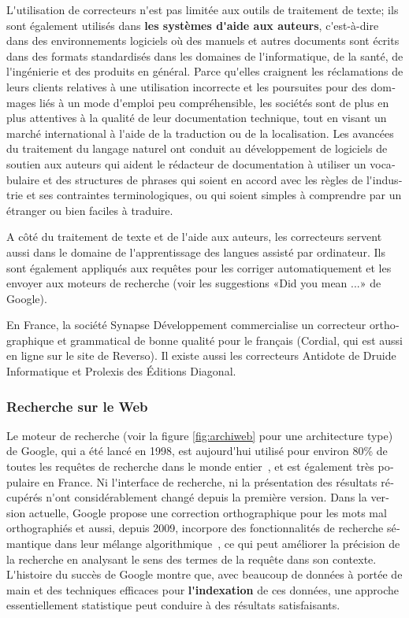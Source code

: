 \documentclass[]{../metanetpaper}
\begin{document}
\begin{french}
\begin{multicols}{2}
L{\mbox '}utilisation de correcteurs n{\mbox '}est pas limitée aux outils de
traitement de texte; ils sont également utilisés dans {\bf les systèmes
d{\mbox '}aide aux auteurs}, c{\mbox '}est-à-dire dans des environnements logiciels où
des manuels et autres documents sont écrits dans des formats
standardisés dans les domaines de l{\mbox '}informatique, de la santé, de
l{\mbox '}ingénierie et des produits en général. Parce qu{\mbox '}elles craignent les
réclamations de leurs clients relatives à une utilisation incorrecte
et les poursuites pour des dommages liés à un mode d{\mbox '}emploi peu
compréhensible, les sociétés sont de plus en plus attentives à la
qualité de leur documentation technique, tout en visant un marché
international à l{\mbox '}aide de la traduction ou de la localisation. Les
avancées du traitement du langage naturel ont conduit au développement
de logiciels de soutien aux auteurs qui aident le rédacteur de
documentation à utiliser un vocabulaire et des structures de phrases
qui soient en accord avec les règles de l{\mbox '}industrie et ses
contraintes terminologiques, ou qui soient simples à comprendre par un
étranger ou bien faciles à traduire.

A côté du traitement de texte et de l{\mbox '}aide aux auteurs, les
correcteurs servent aussi dans le domaine de l{\mbox '}apprentissage des
langues assisté par ordinateur. Ils sont également appliqués aux
requêtes pour les corriger automatiquement et les envoyer aux moteurs
de recherche (voir les suggestions «Did you mean ...» de
Google).

En France, la société Synapse Développement commercialise un
correcteur orthographique et grammatical de bonne qualité pour le
français (Cordial, qui est aussi en ligne sur le site de Reverso). Il
existe aussi les correcteurs Antidote de Druide Informatique et
Prolexis des Éditions Diagonal.

\subsubsection{Recherche sur le Web}
Le moteur de recherche (voir la figure \ref{fig:archiweb} pour une
architecture type) de Google, qui a été lancé en 1998, est aujourd{\mbox '}hui 
utilisé pour environ 80\% de toutes les requêtes de recherche
dans le monde entier~\cite{googleworld}, et est également très
populaire en France. Ni l{\mbox '}interface de recherche, ni la présentation
des résultats récupérés n{\mbox '}ont considérablement changé depuis la
première version. Dans la version actuelle, Google propose une
correction orthographique pour les mots mal orthographiés et aussi,
depuis 2009, incorpore des fonctionnalités de recherche sémantique
dans leur mélange algorithmique~\cite{googlesemantics}, ce qui peut
améliorer la précision de la recherche en analysant le sens des termes
de la requête dans son contexte. L{\mbox '}histoire du succès de Google montre
que, avec beaucoup de données à portée de main et des techniques
efficaces pour {\bf l{\mbox '}indexation} de ces données, une approche
essentiellement statistique peut conduire à des résultats
satisfaisants.


\end{multicols}
\end{french}
\end{document}
